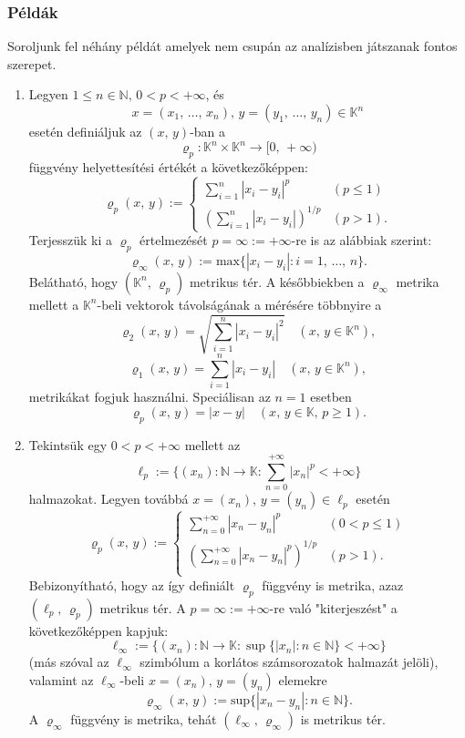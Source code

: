 \documentclass[12pt]{article}
\newcommand{\N}{\mathbb{N}}
\newcommand{\K}{\mathbb{K}}
\begin{document}
    \subsubsection{Példák}
    Soroljunk fel néhány példát amelyek nem csupán az analízisben játszanak fontos szerepet.
    \begin{enumerate}
        \item Legyen $1 \leq n \in \N, \, 0 < p < + \infty$, és
        \[
            x = (x_1, \, \dots, \, x_n), \, y = (y_1, \, \dots, \, y_n) \in \K^n
        \]
        esetén definiáljuk az $(x, \, y)$-ban a
        \[
            \varrho_p : \K^n \times \K^n \to [0, \, +\infty)
        \]
        függvény helyettesítési értékét a következőképpen:
        \[
            \varrho_p(x, \, y) :=
            \begin{cases}
                \displaystyle\sum_{i=1}^n |x_i - y_i|^p & (p \leq 1) \\
                \displaystyle\left( \sum_{i=1}^n |x_i - y_i| \right)^{1/p} & (p > 1).
            \end{cases}
        \]
        Terjesszük ki a $\varrho_p$ értelmezését $p = \infty := +\infty$-re is az alábbiak szerint:
        \[
            \varrho_\infty(x, \, y) := \text{max}\{ |x_i - y_i| : i = 1, \, \dots, \, n \}.
        \]
        Belátható, hogy $(\K^n, \, \varrho_p)$ metrikus tér. A későbbiekben a $\varrho_\infty$ metrika mellett a $\K^n$-beli vektorok távolságának a mérésére többnyire a
        \[
            \varrho_2(x, \, y) = \sqrt{\sum_{i=1}^n |x_i - y_i|^2} \quad (x, \, y \in \K^n),
        \]
        \[
            \varrho_1(x, \, y) = \sum_{i=1}^n |x_i - y_i| \quad (x, \, y \in \K^n),
        \]
        metrikákat fogjuk használni. Speciálisan az $n=1$ esetben
        \[
            \varrho_p(x, \, y) = |x - y| \quad (x, \, y \in \K, \, p \geq 1).
        \]
        \item Tekintsük egy $0 < p < + \infty$ mellett az
        \[
            \ell_p := \Big\{ (x_n) : \N \to \K : \sum_{n = 0}^{+\infty} |x_n|^p < + \infty \Big\}
        \]
        halmazokat. Legyen továbbá $x = (x_n), \, y = (y_n) \in \ell_p$ esetén
        \[
            \varrho_p(x, \, y) := 
            \begin{cases}
                \displaystyle \sum_{n=0}^{+\infty} |x_n - y_n|^p & (0 < p \leq 1) \\
                \displaystyle \left( \sum_{n=0}^{+\infty} |x_n - y_n|^p \right)^{1/p} & (p > 1). \\
            \end{cases}
        \]
        Bebizonyítható, hogy az így definiált $\varrho_p$ függvény is metrika, azaz $(\ell_p, \, \varrho_p)$ metrikus tér. A $p = \infty := + \infty$-re való "kiterjeszést" a következőképpen kapjuk:
        \[
            \ell_\infty := \Big\{ (x_n) : \N \to \K : \sup\{|x_n| : n \in \N \} < +\infty \Big\}
        \]
        (más szóval az $\ell_\infty$ szimbólum a korlátos számsorozatok halmazát jelöli), valamint az $\ell_\infty$-beli $x = (x_n), \, y = (y_n)$ elemekre
        \[
            \varrho_\infty(x, \, y) := \text{sup}\big\{ |x_n - y_n| : n \in \N \big\}.
        \]
        A $\varrho_\infty$ függvény is metrika, tehát $(\ell_\infty, \, \varrho_\infty)$ is metrikus tér.


\end{enumerate}
\end{document}
